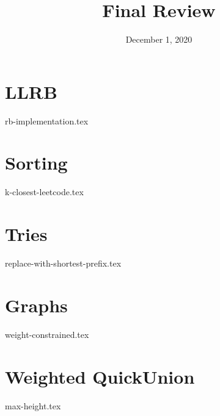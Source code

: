 \documentclass[11pt]{exam}
\title{Final Review}
\date{December 1, 2020}
\begin{document}
\maketitle


\section{LLRB}
\begin{questions}
{rb-implementation.tex}

\end{questions}

\newpage
\section{Sorting}
\begin{questions}
{k-closest-leetcode.tex}
\end{questions}

\newpage
\section{Tries}
\begin{questions}
{replace-with-shortest-prefix.tex}
\end{questions}

\newpage
\section{Graphs}
\begin{questions}
{weight-constrained.tex}
\end{questions}


\newpage
\section{Weighted QuickUnion}
\begin{questions}
{max-height.tex}
\end{questions}


\end{document}
